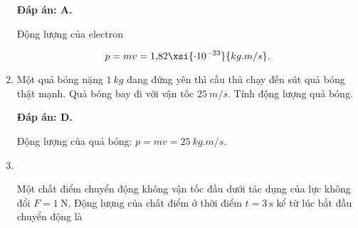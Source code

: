 \begin{enumerate}[label=\bfseries Câu \arabic*:, leftmargin=1.5cm]
{		
		
	}
	
	\hideall
	{	
		\textbf{Đáp án: A.}
		
		Động lượng của electron
		
		$$ p  = mv = \text{1,82}\xsi{\cdot 10^{-23}}{kg.m/s}.$$
	}
	\item {}
	
	
	{
		Một quả bóng nặng $\SI{1}{kg}$ đang đứng yên thì cầu thủ chạy đến sút quả bóng thật mạnh. Quả bóng bay đi với vận tốc $\SI{25}{m/s}$. Tính động lượng quả bóng.
	}
	
	\hideall
	{	
		\textbf{Đáp án: D.}
		
		Động lượng của quả bóng: $p=mv=\SI{25}{kg.m/s}$.
	}
	
	\item {}\\
	{Một chất điểm chuyển động không vận tốc đầu dưới tác dụng của lực không đổi $F =\SI{1}{\newton}$. Động lượng của chất điểm ở thời điểm $t = \SI{3}{\second}$ kể từ lúc bắt đầu chuyển động là
	
}
	

\end{enumerate}
